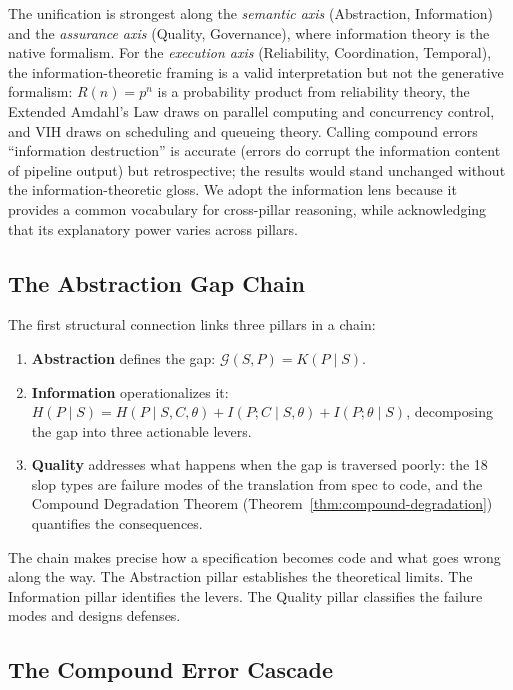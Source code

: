 The unification is strongest along the \emph{semantic axis} (Abstraction, Information) and the \emph{assurance axis} (Quality, Governance), where information theory is the native formalism. For the \emph{execution axis} (Reliability, Coordination, Temporal), the information-theoretic framing is a valid interpretation but not the generative formalism: $R(n) = p^n$ is a probability product from reliability theory, the Extended Amdahl's Law draws on parallel computing and concurrency control, and VIH draws on scheduling and queueing theory. Calling compound errors ``information destruction'' is accurate (errors do corrupt the information content of pipeline output) but retrospective; the results would stand unchanged without the information-theoretic gloss. We adopt the information lens because it provides a common vocabulary for cross-pillar reasoning, while acknowledging that its explanatory power varies across pillars.

\subsection{The Abstraction Gap Chain}

The first structural connection links three pillars in a chain:

\begin{enumerate}
    \item \textbf{Abstraction} defines the gap: $\mathcal{G}(S,P) = K(P \mid S)$.
    \item \textbf{Information} operationalizes it: $H(P \mid S) = H(P \mid S,C,\theta) + I(P;C \mid S,\theta) + I(P;\theta \mid S)$, decomposing the gap into three actionable levers.
    \item \textbf{Quality} addresses what happens when the gap is traversed poorly: the 18 slop types are failure modes of the translation from spec to code, and the Compound Degradation Theorem (Theorem~\ref{thm:compound-degradation}) quantifies the consequences.
\end{enumerate}

The chain makes precise how a specification becomes code and what goes wrong along the way. The Abstraction pillar establishes the theoretical limits. The Information pillar identifies the levers. The Quality pillar classifies the failure modes and designs defenses.

\subsection{The Compound Error Cascade}

